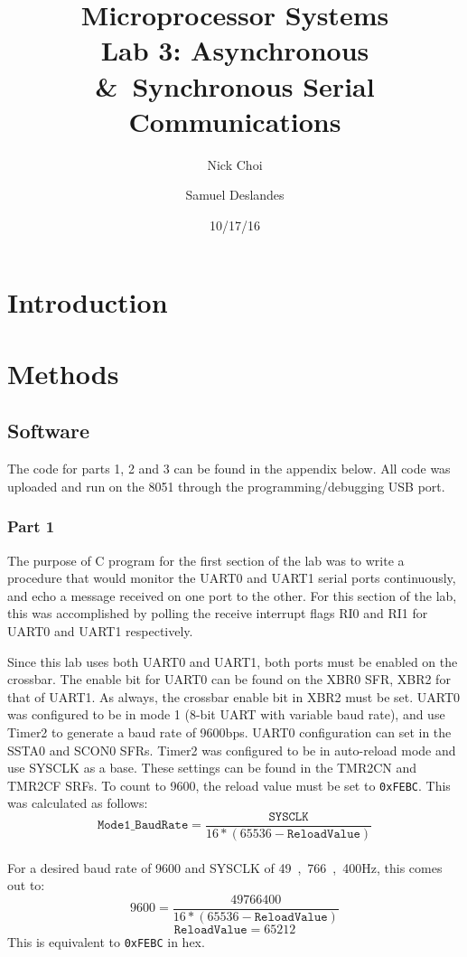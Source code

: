 \documentclass[12pt]{article}
\begin{document}
\title{Microprocessor Systems\\ Lab 3: Asynchronous \&\ Synchronous Serial Communications }
\author{Nick Choi \and Samuel Deslandes}
\date{10/17/16}
\maketitle
\pagebreak
\section{Introduction}


\section{Methods}
\subsection{Software}
The code for parts 1, 2 and 3 can be found in the appendix below. All code was uploaded and run on the 8051 through the programming/debugging USB port. 	

\subsubsection{Part 1}
The purpose of C program for the first section of the lab was to write a procedure that would monitor the UART0 and UART1 serial ports continuously, and echo a message received on one port to the other. For this section of the lab, this was accomplished by polling the receive interrupt flags RI0 and RI1 for UART0 and UART1 respectively. 

Since this lab uses both UART0 and UART1, both ports must be enabled on the crossbar. The enable bit for UART0 can be found on the XBR0 SFR, XBR2 for that of UART1. As always, the crossbar enable bit in XBR2 must be set. UART0 was configured to be in mode 1 (8-bit UART with variable baud rate), and use Timer2 to generate a baud rate of \si{9600}{bps}. UART0 configuration can set in the SSTA0 and SCON0 SFRs. Timer2 was configured to be in auto-reload mode and use SYSCLK as a base. These settings can be found in the TMR2CN and TMR2CF SRFs. To count to 9600, the reload value must be set to \texttt{0xFEBC}. This was calculated as follows:\\
\begin{equation}
	\mathtt{Mode1\_BaudRate} = \frac{\mathtt{SYSCLK}}{16*(65536-\mathtt{ReloadValue})}
\end{equation}\\
For a desired baud rate of 9600 and SYSCLK of \si{49,766,400}{Hz}, this comes out to:\\
\begin{equation}
9600= \frac{49766400}{16*(65536-\mathtt{ReloadValue})}
\end{equation}
\begin{equation}
\mathtt{ReloadValue} = 65212
\end{equation}
This is equivalent to \texttt{0xFEBC} in hex.
\end{document}
